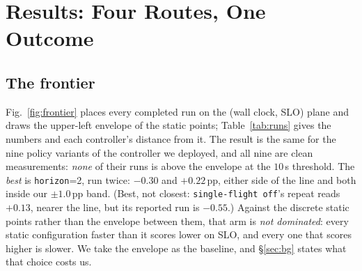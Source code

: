 \section{Results: Four Routes, One Outcome}
\label{sec:results}

\subsection{The frontier}

Fig.~\ref{fig:frontier} places every completed run on the (wall clock, SLO)
plane and draws the upper-left envelope of the static points; Table~\ref{tab:runs}
gives the numbers and each controller's distance from it. The result is
the same for the nine policy variants of the controller we deployed, and all nine
are clean measurements: \emph{none} of their runs is above the envelope at the
$10$\,s threshold. The \emph{best} is \texttt{horizon}=2, run
twice: $-0.30$ and $+0.22$\,pp, either side of the line and both inside our
$\pm1.0$\,pp band. (Best, not closest: \texttt{single-flight off}'s repeat reads
$+0.13$, nearer the line, but its reported run is $-0.55$.) Against the discrete
static points rather than the envelope between them, that arm is \emph{not
dominated}: every static configuration faster than it scores lower on SLO, and
every one that scores higher is slower. We take the envelope as the baseline, and
\S\ref{sec:bg} states what that choice costs us.


